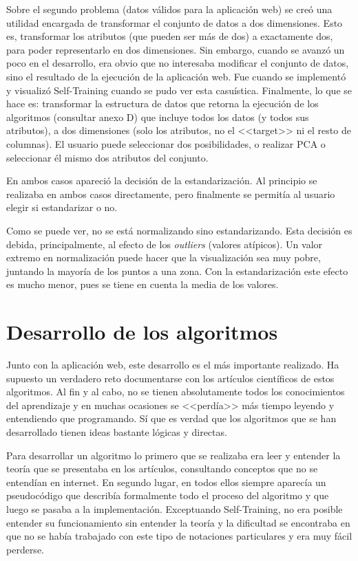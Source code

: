 Sobre el segundo problema (datos válidos para la aplicación web) se creó una
utilidad encargada de transformar el conjunto de datos a dos dimensiones. Esto
es, transformar los atributos (que pueden ser más de dos) a exactamente dos,
para poder representarlo en dos dimensiones. Sin embargo, cuando se avanzó un
poco en el desarrollo, era obvio que no interesaba modificar el conjunto de
datos, sino el resultado de la ejecución de la aplicación web. Fue cuando se
implementó y visualizó Self-Training cuando se pudo ver esta casuística.
Finalmente, lo que se hace es: transformar la estructura de datos que retorna la
ejecución de los algoritmos (consultar anexo D) que incluye todos los datos (y
todos sus atributos), a dos dimensiones (solo los atributos, no el <<target>> ni
el resto de columnas). El usuario puede seleccionar dos posibilidades, o
realizar PCA o seleccionar él mismo dos atributos del conjunto.

En ambos casos apareció la decisión de la estandarización. Al principio se
realizaba en ambos casos directamente, pero finalmente se permitía al usuario
elegir si estandarizar o no.

Como se puede ver, no se está normalizando sino estandarizando. Esta decisión es
debida, principalmente, al efecto de los \emph{outliers} (valores atípicos).
Un valor extremo en normalización puede hacer que la visualización sea muy
pobre, juntando la mayoría de los puntos a una zona. Con la estandarización este
efecto es mucho menor, pues se tiene en cuenta la media de los valores.

\clearpage
\section{Desarrollo de los algoritmos}

Junto con la aplicación web, este desarrollo es el más importante realizado. Ha
supuesto un verdadero reto documentarse con los artículos científicos de estos
algoritmos. Al fin y al cabo, no se tienen absolutamente todos los conocimientos
del aprendizaje y en muchas ocasiones se <<perdía>> más tiempo leyendo y
entendiendo que programando. Sí que es verdad que los algoritmos que se han
desarrollado tienen ideas bastante lógicas y directas.

Para desarrollar un algoritmo lo primero que se realizaba era leer y entender la
teoría que se presentaba en los artículos, consultando conceptos que no se
entendían en internet. En segundo lugar, en todos ellos siempre aparecía un
pseudocódigo que describía formalmente todo el proceso del algoritmo y que luego
se pasaba a la implementación. Exceptuando Self-Training, no era posible
entender su funcionamiento sin entender la teoría y la dificultad se encontraba
en que no se había trabajado con este tipo de notaciones particulares y era muy
fácil perderse.

